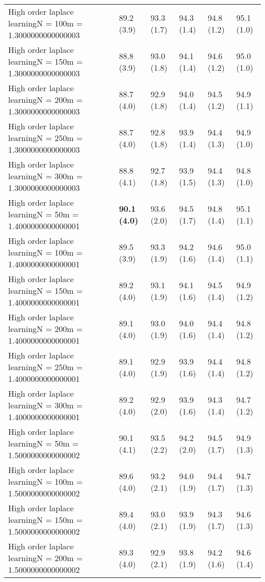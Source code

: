 \documentclass{article}
\begin{document}
\begin{table*}[t!]
\begin{center}
\begin{small}
\begin{sc}
\begin{tabular}{llllll}
High order laplace learningN = 100m = 1.3000000000000003&89.2 (3.9)      &93.3 (1.7)      &94.3 (1.4)      &94.8 (1.2)      &95.1 (1.0)      \\
High order laplace learningN = 150m = 1.3000000000000003&88.8 (3.9)      &93.0 (1.8)      &94.1 (1.4)      &94.6 (1.2)      &95.0 (1.0)      \\
High order laplace learningN = 200m = 1.3000000000000003&88.7 (4.0)      &92.9 (1.8)      &94.0 (1.4)      &94.5 (1.2)      &94.9 (1.1)      \\
High order laplace learningN = 250m = 1.3000000000000003&88.7 (4.0)      &92.8 (1.8)      &93.9 (1.4)      &94.4 (1.3)      &94.9 (1.0)      \\
High order laplace learningN = 300m = 1.3000000000000003&88.8 (4.1)      &92.7 (1.8)      &93.9 (1.5)      &94.4 (1.3)      &94.8 (1.0)      \\
High order laplace learningN = 50m = 1.4000000000000001&{\bf 90.1 (4.0)}&93.6 (2.0)      &94.5 (1.7)      &94.8 (1.4)      &95.1 (1.1)      \\
High order laplace learningN = 100m = 1.4000000000000001&89.5 (3.9)      &93.3 (1.9)      &94.2 (1.6)      &94.6 (1.4)      &95.0 (1.1)      \\
High order laplace learningN = 150m = 1.4000000000000001&89.2 (4.0)      &93.1 (1.9)      &94.1 (1.6)      &94.5 (1.4)      &94.9 (1.2)      \\
High order laplace learningN = 200m = 1.4000000000000001&89.1 (4.0)      &93.0 (1.9)      &94.0 (1.6)      &94.4 (1.4)      &94.8 (1.2)      \\
High order laplace learningN = 250m = 1.4000000000000001&89.1 (4.0)      &92.9 (1.9)      &93.9 (1.6)      &94.4 (1.4)      &94.8 (1.2)      \\
High order laplace learningN = 300m = 1.4000000000000001&89.2 (4.0)      &92.9 (2.0)      &93.9 (1.6)      &94.3 (1.4)      &94.7 (1.2)      \\
High order laplace learningN = 50m = 1.5000000000000002&90.1 (4.1)      &93.5 (2.2)      &94.2 (2.0)      &94.5 (1.7)      &94.9 (1.3)      \\
High order laplace learningN = 100m = 1.5000000000000002&89.6 (4.0)      &93.2 (2.1)      &94.0 (1.9)      &94.4 (1.7)      &94.7 (1.3)      \\
High order laplace learningN = 150m = 1.5000000000000002&89.4 (4.0)      &93.0 (2.1)      &93.9 (1.9)      &94.3 (1.7)      &94.6 (1.3)      \\
High order laplace learningN = 200m = 1.5000000000000002&89.3 (4.0)      &92.9 (2.1)      &93.8 (1.9)      &94.2 (1.6)      &94.6 (1.4)      \\

\end{tabular}
\end{sc}
\end{small}
\end{center}
\end{table*}
\end{document}
